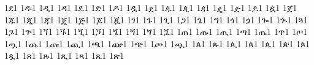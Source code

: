 {1ደ1 %
1ዱ1 %
1ዲ1 %
1ዳ1 %
1ዴ1 %
1ድ1 %
1ዶ1 %
1ዷ1 %
1ዸ1 %
1ዹ1 %
1ዺ1 %
1ዻ1 %
1ዼ1 %
1ዽ1 %
1ዾ1 %
1ዿ1 %
1ጀ1 %
1ጁ1 %
1ጂ1 %
1ጃ1 %
1ጄ1 %
1ጅ1 %
1ጆ1 %
1ጇ1 %
1ገ1 %
1ጉ1 %
1ጊ1 %
1ጋ1 %
1ጌ1 %
1ግ1 %
1ጎ1 %
1ጏ1 %
1ጐ1 %
1ጒ1 %
1ጓ1 %
1ጔ1 %
1ጕ1 %
1ጘ1 %
1ጙ1 %
1ጚ1 %
1ጛ1 %
1ጜ1 %
1ጝ1 %
1ጞ1 %
1ጟ1 %
1ጠ1 %
1ጡ1 %
1ጢ1 %
1ጣ1 %
1ጤ1 %
1ጥ1 %
1ጦ1 %
1ጧ1 %
1ጨ1 %
1ጩ1 %
1ጪ1 %
1ጫ1 %
1ጬ1 %
1ጭ1 %
1ጮ1 %
1ጯ1 %
1ጰ1 %
1ጱ1 %
1ጲ1 %
1ጳ1 %
1ጴ1 %
1ጵ1 %
1ጶ1 %
1ጷ1 %
1ጸ1 %
1ጹ1 %
1ጺ1 %
1ጻ1 %
1ጼ1 %
1ጽ1 %
}
